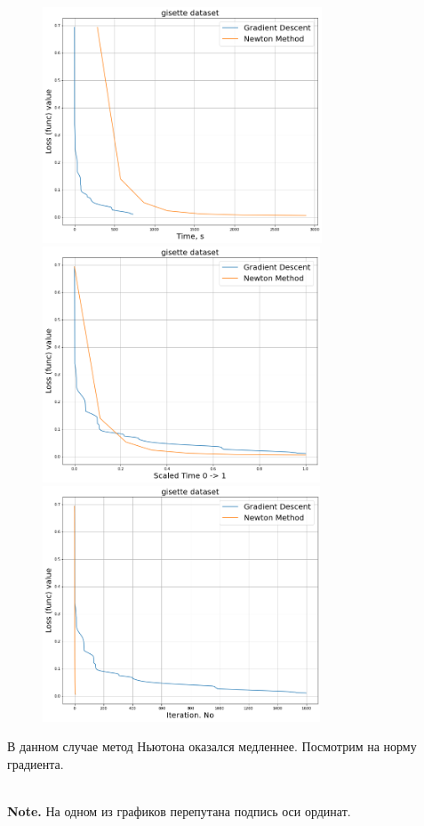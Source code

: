 \documentclass[14pt]{article}
\begin{document}
\begin{figure}[h]
	\centering
	\includegraphics[height=7cm]{gisette_time.png}
	\includegraphics[height=7cm]{gisette_scale_time.png}
	\includegraphics[height=7cm]{gisette_time_no.png}
\end{figure}

В данном случае метод Ньютона оказался медленнее. Посмотрим на норму градиента.
 
 \\ \textbf{Note.} На одном из графиков перепутана подпись оси ординат.
 
\end{document}
